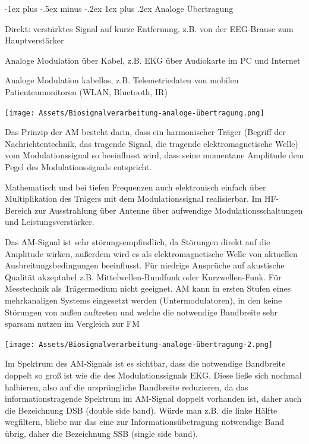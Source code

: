 \documentclass[a4paper]{article}
\makeatletter
\renewcommand{\subsubsection}{\@startsection{subsubsection}{3}{0mm}%
 {-1ex plus -.5ex minus -.2ex}%
 {1ex plus .2ex}%
 {\normalfont\small\bfseries}}
\makeatother
\begin{document}
\begin{multicols}{3}
  \subsubsection{Analoge Übertragung}\label{analoge-uxfcbertragung}
  \begin{itemize*}
    \item Direkt: verstärktes Signal auf kurze Entfernung, z.B. von der EEG-Brause zum Hauptverstärker
    \item Analoge Modulation über Kabel, z.B. EKG über Audiokarte im PC und Internet
    \item Analoge Modulation kabellos, z.B. Telemetriedaten von mobilen Patientenmonitoren (WLAN, Bluetooth, IR)
    \item \texttt{[image: Assets/Biosignalverarbeitung-analoge-übertragung.png]}
    \item Das Prinzip der AM besteht darin, dass ein harmonischer Träger (Begriff der Nachrichtentechnik, das tragende Signal, die tragende elektromagnetische Welle) vom Modulationssignal so beeinflusst wird, dass seine momentane Amplitude dem Pegel des Modulationssignals entspricht.
    \begin{itemize*}
      \item Mathematisch und bei tiefen Frequenzen auch elektronisch einfach über Multiplikation des Trägers mit dem Modulationssignal realisierbar. Im HF-Bereich zur Ausstrahlung über Antenne über aufwendige Modulationsschaltungen und Leistungsverstärker.
      \item Das AM-Signal ist sehr störungsempfindlich, da Störungen direkt auf die Amplitude wirken, außerdem wird es als elektromagnetische Welle von aktuellen Ausbreitungsbedingungen beeinflusst. Für niedrige Ansprüche auf akustische Qualität akzeptabel z.B. Mittelwellen-Rundfunk oder Kurzwellen-Funk. Für Messtechnik als Trägermedium nicht geeignet. AM kann in ersten Stufen eines mehrkanaligen Systems eingesetzt werden (Untermodulatoren), in den keine Störungen von außen auftreten und welche die notwendige Bandbreite sehr sparsam nutzen im Vergleich zur FM
    \end{itemize*}
    \item \texttt{[image: Assets/Biosignalverarbeitung-analoge-übertragung-2.png]}
    \item Im Spektrum des AM-Signals ist es sichtbar, dass die notwendige Bandbreite doppelt so groß ist wie die des Modulationssignals EKG. Diese ließe sich nochmal halbieren, also auf die ursprüngliche Bandbreite reduzieren, da das informationstragende Spektrum im AM-Signal doppelt vorhanden ist, daher auch die Bezeichnung DSB (double side band). Würde man z.B. die linke Hälfte wegfiltern, bliebe nur das eine zur Informationsübetragung notwendige Band übrig, daher die Bezeichnung SSB (single side band).

\end{itemize*}
\end{multicols}
\end{document}
